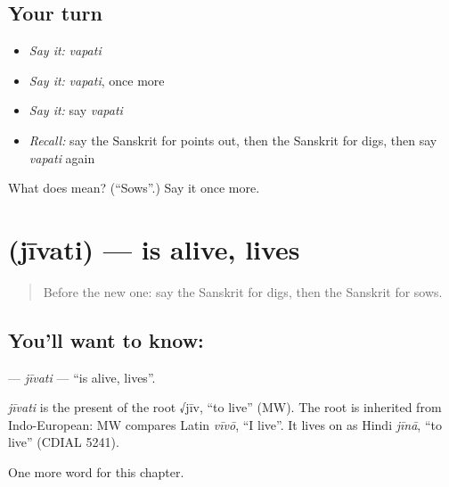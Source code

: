 \subsection*{Your turn}
\begin{itemize}
\raggedright
  \item \emph{Say it:} \emph{vapati}
  \item \emph{Say it:} \emph{vapati}, once more
  \item \emph{Say it:} say \emph{vapati}
  \item \emph{Recall:} say the Sanskrit for points out, then the Sanskrit for digs, then say \emph{vapati} again
\end{itemize}

\begin{tcolorbox}[breakable,colback=teal!4,colframe=teal!35!black,title={Before you move on}]
What does  mean? (\textquotedblleft{}Sows\textquotedblright{}.) Say it once more.
\end{tcolorbox}
\section[\texorpdfstring{\sk{जीवति} (jīvati)}{जीवति (jīvati)}]{ (jīvati) — is alive, lives}

\label{lesson:SA-C204-jivati}



\begin{quote}
Before the new one: say the Sanskrit for digs, then the Sanskrit for sows.
\end{quote}

\subsection*{You'll want to know: }
\textbf{} — \emph{jīvati} — \textquotedblleft{}is alive, lives\textquotedblright{}.

\begin{cousinweb}
\emph{jīvati} is the present of the root √jīv, \textquotedblleft{}to live\textquotedblright{} (MW). The root is inherited from Indo-European: MW compares Latin \emph{vīvō}, \textquotedblleft{}I live\textquotedblright{}. It lives on as Hindi \emph{jīnā}, \textquotedblleft{}to live\textquotedblright{} (CDIAL 5241).
\end{cousinweb}

\begin{grammarlens}[title={What you've built}]
One more word for this chapter.
\end{grammarlens}

